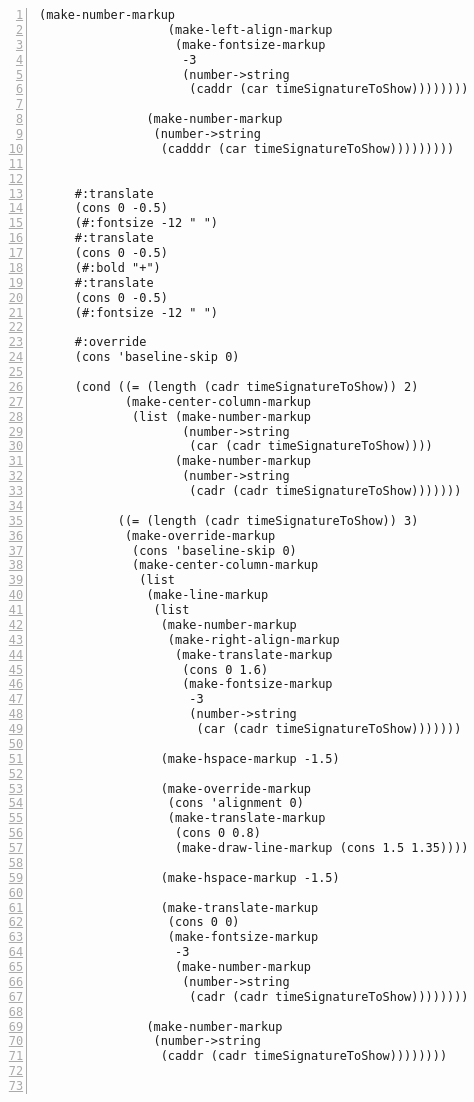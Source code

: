 \begin{Verbatim}[numbers=left,xleftmargin=5mm]
                 (make-number-markup
                  (make-left-align-markup
                   (make-fontsize-markup
                    -3
                    (number->string
                     (caddr (car timeSignatureToShow))))))))

               (make-number-markup
                (number->string
                 (cadddr (car timeSignatureToShow)))))))))


     #:translate
     (cons 0 -0.5)
     (#:fontsize -12 " ")
     #:translate
     (cons 0 -0.5)
     (#:bold "+")
     #:translate
     (cons 0 -0.5)
     (#:fontsize -12 " ")

     #:override
     (cons 'baseline-skip 0)

     (cond ((= (length (cadr timeSignatureToShow)) 2)
            (make-center-column-markup
             (list (make-number-markup
                    (number->string
                     (car (cadr timeSignatureToShow))))
                   (make-number-markup
                    (number->string
                     (cadr (cadr timeSignatureToShow)))))))

           ((= (length (cadr timeSignatureToShow)) 3)
            (make-override-markup
             (cons 'baseline-skip 0)
             (make-center-column-markup
              (list
               (make-line-markup
                (list
                 (make-number-markup
                  (make-right-align-markup
                   (make-translate-markup
                    (cons 0 1.6)
                    (make-fontsize-markup
                     -3
                     (number->string
                      (car (cadr timeSignatureToShow)))))))

                 (make-hspace-markup -1.5)

                 (make-override-markup
                  (cons 'alignment 0)
                  (make-translate-markup
                   (cons 0 0.8)
                   (make-draw-line-markup (cons 1.5 1.35))))

                 (make-hspace-markup -1.5)

                 (make-translate-markup
                  (cons 0 0)
                  (make-fontsize-markup
                   -3
                   (make-number-markup
                    (number->string
                     (cadr (cadr timeSignatureToShow))))))))

               (make-number-markup
                (number->string
                 (caddr (cadr timeSignatureToShow))))))))



\end{Verbatim}
